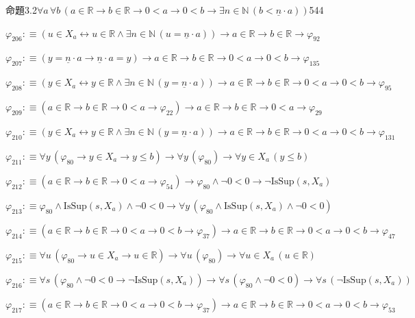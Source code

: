 \begin{fullproof}{命題3.2}{$\forall a\,\forall b\,(a \in \mathbb{R} \to b \in \mathbb{R} \to 0 < a \to 0 < b \to \exists n \in \mathbb{N}\,(b < \underline{n} \cdot a))$}{544}
\begin{abbrevlist}
\item $\varphi_{206} :\equiv (u \in X_{a} \leftrightarrow u \in \mathbb{R} \land \exists n \in \mathbb{N}\,(u = \underline{n} \cdot a)) \to a \in \mathbb{R} \to b \in \mathbb{R} \to \varphi_{92}$
\item $\varphi_{207} :\equiv (y = \underline{n} \cdot a \to \underline{n} \cdot a = y) \to a \in \mathbb{R} \to b \in \mathbb{R} \to 0 < a \to 0 < b \to \varphi_{135}$
\item $\varphi_{208} :\equiv (y \in X_{a} \leftrightarrow y \in \mathbb{R} \land \exists n \in \mathbb{N}\,(y = \underline{n} \cdot a)) \to a \in \mathbb{R} \to b \in \mathbb{R} \to 0 < a \to 0 < b \to \varphi_{95}$
\item $\varphi_{209} :\equiv (a \in \mathbb{R} \to b \in \mathbb{R} \to 0 < a \to \varphi_{22}) \to a \in \mathbb{R} \to b \in \mathbb{R} \to 0 < a \to \varphi_{29}$
\item $\varphi_{210} :\equiv (y \in X_{a} \leftrightarrow y \in \mathbb{R} \land \exists n \in \mathbb{N}\,(y = \underline{n} \cdot a)) \to a \in \mathbb{R} \to b \in \mathbb{R} \to 0 < a \to 0 < b \to \varphi_{131}$
\item $\varphi_{211} :\equiv \forall y\,(\varphi_{80} \to y \in X_{a} \to y \leq b) \to \forall y\,(\varphi_{80}) \to \forall y \in X_{a}\,(y \leq b)$
\item $\varphi_{212} :\equiv (a \in \mathbb{R} \to b \in \mathbb{R} \to 0 < a \to \varphi_{54}) \to \varphi_{80} \land \neg 0 < 0 \to \neg \mathrm{IsSup}(s,X_{a})$
\item $\varphi_{213} :\equiv \varphi_{80} \land \mathrm{IsSup}(s,X_{a}) \land \neg 0 < 0 \to \forall y\,(\varphi_{80} \land \mathrm{IsSup}(s,X_{a}) \land \neg 0 < 0)$
\item $\varphi_{214} :\equiv (a \in \mathbb{R} \to b \in \mathbb{R} \to 0 < a \to 0 < b \to \varphi_{37}) \to a \in \mathbb{R} \to b \in \mathbb{R} \to 0 < a \to 0 < b \to \varphi_{47}$
\item $\varphi_{215} :\equiv \forall u\,(\varphi_{80} \to u \in X_{a} \to u \in \mathbb{R}) \to \forall u\,(\varphi_{80}) \to \forall u \in X_{a}\,(u \in \mathbb{R})$
\item $\varphi_{216} :\equiv \forall s\,(\varphi_{80} \land \neg 0 < 0 \to \neg \mathrm{IsSup}(s,X_{a})) \to \forall s\,(\varphi_{80} \land \neg 0 < 0) \to \forall s\,(\neg \mathrm{IsSup}(s,X_{a}))$
\item $\varphi_{217} :\equiv (a \in \mathbb{R} \to b \in \mathbb{R} \to 0 < a \to 0 < b \to \varphi_{37}) \to a \in \mathbb{R} \to b \in \mathbb{R} \to 0 < a \to 0 < b \to \varphi_{53}$

\end{abbrevlist}
\end{fullproof}
